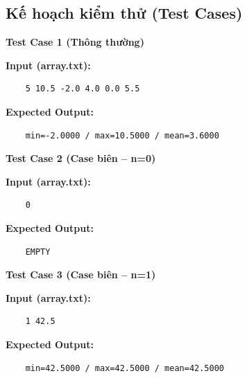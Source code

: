 \subsection{Kế hoạch kiểm thử (Test Cases)}

    \textbf{Test Case 1 (Thông thường)}

    \textbf{Input (array.txt):}
    \begin{lstlisting}
    5 10.5 -2.0 4.0 0.0 5.5\end{lstlisting}

    \textbf{Expected Output:}
    \begin{lstlisting}
    min=-2.0000 / max=10.5000 / mean=3.6000\end{lstlisting}

    \vspace{0.5cm}

    \textbf{Test Case 2 (Case biên -- n=0)}

    \textbf{Input (array.txt):}
    \begin{lstlisting}
    0\end{lstlisting}

    \textbf{Expected Output:}
    \begin{lstlisting}
    EMPTY\end{lstlisting}
    \textbf{Test Case 3 (Case biên -- n=1)}

    \textbf{Input (array.txt):}
    \begin{lstlisting}
    1 42.5\end{lstlisting}

    \textbf{Expected Output:}
    \begin{lstlisting}
    min=42.5000 / max=42.5000 / mean=42.5000\end{lstlisting}